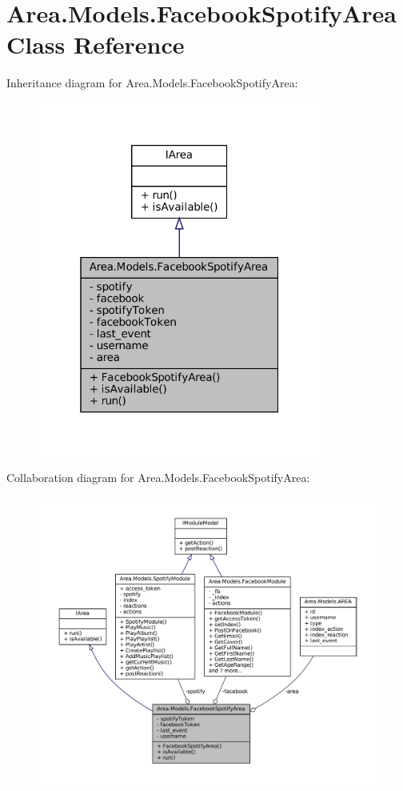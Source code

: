 \hypertarget{classArea_1_1Models_1_1FacebookSpotifyArea}{}\section{Area.\+Models.\+Facebook\+Spotify\+Area Class Reference}
\label{classArea_1_1Models_1_1FacebookSpotifyArea}


Inheritance diagram for Area.\+Models.\+Facebook\+Spotify\+Area\+:
\nopagebreak
\begin{figure}[H]
\begin{center}
\leavevmode
\includegraphics[width=265pt]{classArea_1_1Models_1_1FacebookSpotifyArea__inherit__graph}
\end{center}
\end{figure}


Collaboration diagram for Area.\+Models.\+Facebook\+Spotify\+Area\+:
\nopagebreak
\begin{figure}[H]
\begin{center}
\leavevmode
\includegraphics[width=350pt]{classArea_1_1Models_1_1FacebookSpotifyArea__coll__graph}
\end{center}
\end{figure}
